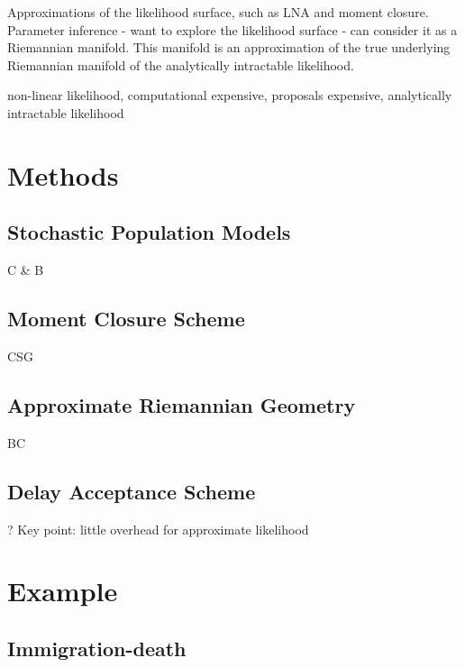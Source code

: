 \documentclass{pnastwo}
\begin{document}
\begin{article}
Approximations of the likelihood surface, such as LNA and moment closure.  Parameter inference - want to explore the likelihood surface - can consider it as a Riemannian manifold.  This manifold is an approximation of the true underlying Riemannian manifold of the analytically intractable likelihood.

non-linear likelihood, computational expensive, proposals expensive, analytically intractable likelihood



\section{Methods}

\subsection{Stochastic Population Models}

C \& B

\subsection{Moment Closure Scheme}

CSG

\subsection{Approximate Riemannian Geometry}
BC

\subsection{Delay Acceptance Scheme}

?
Key point: little overhead for approximate likelihood


\section{Example}

\subsection{Immigration-death}



\end{article}
\end{document}

